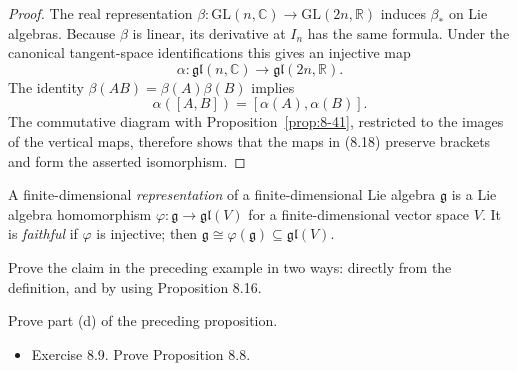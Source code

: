 \begin{proof}

\sketch The real representation
$\beta\colon\mathrm{GL}(n,\mathbb{C})\to\mathrm{GL}(2n,\mathbb{R})$ induces
$\beta_* $ on Lie algebras. Because $\beta$ is linear, its derivative at
$I_n$ has the same formula. Under the canonical tangent-space identifications
this gives an injective map
\[
\alpha\colon\mathfrak{gl}(n,\mathbb{C})
\longrightarrow\mathfrak{gl}(2n,\mathbb{R}).
\]
The identity $\beta(AB)=\beta(A)\beta(B)$ implies
\[
\alpha([A,B])=[\alpha(A),\alpha(B)].
\]
The commutative diagram with Proposition~\ref{prop:8-41}, restricted to the
images of the vertical maps, therefore shows that the maps in (8.18) preserve
brackets and form the asserted isomorphism.
\end{proof}

\begin{definition}
\label{def:8-62-extra-1}



A finite-dimensional \emph{representation} of a finite-dimensional Lie
algebra $\mathfrak g$ is a Lie algebra homomorphism
$\varphi\colon\mathfrak g\to\mathfrak{gl}(V)$ for a finite-dimensional vector
space $V$. It is \emph{faithful} if $\varphi$ is injective; then
$\mathfrak g\cong\varphi(\mathfrak g)\subseteq\mathfrak{gl}(V)$.
\end{definition}

\begin{exercise}
\label{exer:8-18}


Prove the claim in the preceding example in two ways: directly from the definition, and by using Proposition 8.16.
\end{exercise}

\begin{exercise}
\label{exer:8-29}


Prove part (d) of the preceding proposition.
\end{exercise}

\begin{exercise}
\label{exer:8-9}


\begin{itemize}
\item Exercise 8.9. Prove Proposition 8.8.
\end{itemize}
\end{exercise}
